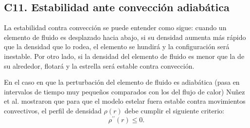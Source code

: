 \subsection*{C11. Estabilidad ante convección adiabática}

La estabilidad contra convección se puede entender como sigue: cuando un elemento de fluido es desplazado hacia abajo, si su densidad aumenta más rápido que la densidad que lo rodea, el elemento se hundirá y la configuraci\'on será inestable. Por otro lado, si la densidad del elemento de fluido es menor que la de su alrededor, flotará y la estrella será estable contra convección.

En el caso en que la perturbación del elemento de fluido es adiabática (pasa en intervalos de tiempo muy pequeños comparados con los del flujo de calor) Nuñez et al. \cite{Hernandez2018} mostraron que para que el modelo estelar fuera estable contra movimientos convectivos, el perfil de densidad $\rho(r)$ debe cumplir el siguiente criterio: 
\begin{equation}
    \rho ^ { \prime \prime } ( r ) \leq 0.
\end{equation}
